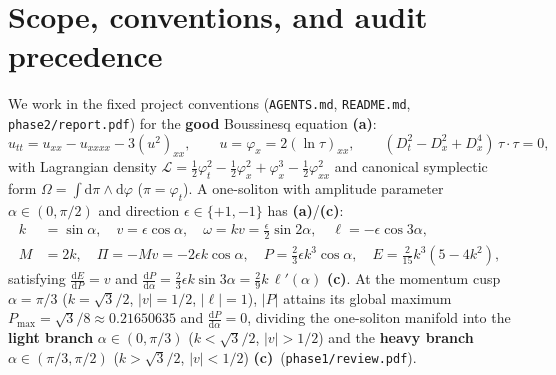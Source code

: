 \documentclass[11pt,a4paper]{article}
\newcommand{\La}{\textsf{\textbf{(a)}}\xspace}
\newcommand{\Lc}{\textsf{\textbf{(c)}}\xspace}
\newcommand{\dd}{\mathrm{d}}
\theoremstyle{remark}
\begin{document}
\tableofcontents
\clearpage

\section{Scope, conventions, and audit precedence}
\label{sec:setup}

We work in the fixed project conventions (\texttt{AGENTS.md},
\texttt{README.md}, \texttt{phase2/\allowbreak report.pdf}) for the
\textbf{good} Boussinesq equation \La:
\begin{equation}\label{eq:good_pde}
  u_{tt} = u_{xx} - u_{xxxx} - 3(u^2)_{xx}, \qquad
  u = \varphi_x = 2(\ln\tau)_{xx}, \qquad
  (D_t^2 - D_x^2 + D_x^4)\,\tau\cdot\tau = 0,
\end{equation}
with Lagrangian density $\mathcal{L} = \frac{1}{2}\varphi_t^2 - \frac{1}{2}\varphi_x^2 + \varphi_x^3 - \frac{1}{2}\varphi_{xx}^2$
and canonical symplectic form $\Omega = \int \dd\pi\wedge\dd\varphi$ ($\pi=\varphi_t$).
A one-soliton with amplitude parameter $\alpha\in(0,\pi/2)$ and direction
$\epsilon\in\{+1,-1\}$ has \La/\Lc:
\begin{align}\label{eq:onesol}
  k &= \sin\alpha, \quad v = \epsilon\cos\alpha, \quad
  \omega = kv = \frac{\epsilon}{2}\sin 2\alpha, \quad
  \ell = -\epsilon\cos 3\alpha, \nonumber\\
  M &= 2k, \quad \Pi = -Mv = -2\epsilon k\cos\alpha, \quad
  P = \frac{2}{3}\epsilon k^3\cos\alpha, \quad
  E = \frac{2}{15}k^3(5-4k^2),
\end{align}
satisfying $\frac{\dd E}{\dd P} = v$ and $\frac{\dd P}{\dd\alpha} = \frac{2}{3}\epsilon k\sin 3\alpha = \frac{2}{9}k\,\ell'(\alpha)$ \Lc.
At the momentum cusp $\alpha = \pi/3$ ($k = \sqrt{3}/2$, $|v| = 1/2$, $|\ell|=1$),
$|P|$ attains its global maximum $P_{\max} = \sqrt{3}/8 \approx 0.21650635$ and
$\frac{\dd P}{\dd\alpha} = 0$, dividing the one-soliton manifold into the
\textbf{light branch} $\alpha\in(0,\pi/3)$ ($k<\sqrt{3}/2$, $|v|>1/2$) and the
\textbf{heavy branch} $\alpha\in(\pi/3,\pi/2)$ ($k>\sqrt{3}/2$, $|v|<1/2$) \Lc\
(\texttt{phase1/\allowbreak review.pdf}).
\end{document}
